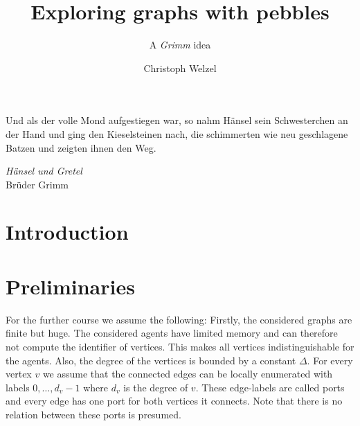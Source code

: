\documentclass[draft,oneside]{scrartcl}
\begin{document}
\setlength{\epigraphwidth}{0.7\textwidth}

\title{Exploring graphs with pebbles}
\subtitle{A \emph{Grimm} idea}
\author{Christoph Welzel}
\maketitle

\epigraph{Und als der volle Mond aufgestiegen war, so nahm Hänsel sein %
Schwesterchen an der Hand und ging den Kieselsteinen nach, die schimmerten %
wie neu geschlagene Batzen und zeigten ihnen den Weg.}%
{\emph{Hänsel und Gretel}\\Brüder Grimm}

\section{Introduction}

\section{Preliminaries}
For the further course we assume the following: Firstly, the considered
graphs are finite but huge. The considered agents have limited memory and can
therefore not compute the identifier of vertices. This makes all vertices
indistinguishable for the agents. Also, the degree of the vertices is bounded
by a constant $\Delta$. For every vertex $v$ we assume that the connected edges
can be locally enumerated with labels $0,\dots,d_{v} - 1$ where $d_{v}$ is the
degree of $v$. These edge-labels are called ports and every edge has one port
for both vertices it connects. Note that there is no relation between these
ports is presumed.
\end{document}
